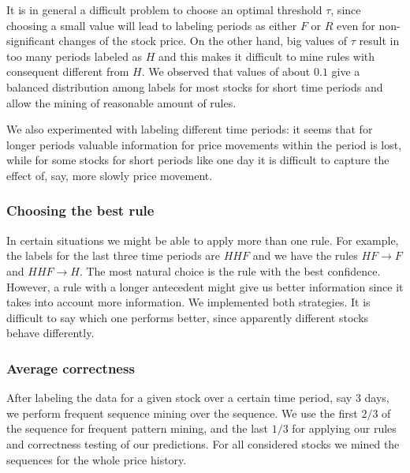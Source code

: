 \documentclass[10pt]{article}
\begin{document}
It is in general a difficult problem to choose an optimal threshold $\tau$, since choosing a small value will lead to labeling periods as either $F$ or $R$ even for non-significant changes of the stock price. On the other hand, big values of $\tau$ result in too many periods labeled as $H$ and this makes it difficult to mine rules with consequent different from $H$.  We observed that values of about $0.1$ give a balanced distribution among labels for most stocks for short time periods and allow the mining of reasonable amount of rules. 

We also experimented with labeling different time periods: it seems that for longer periods valuable information for price movements within the period is lost, while for some stocks for short periods like one day it is difficult to capture the effect of, say, more slowly price movement.  

\subsubsection{Choosing the best rule}
In certain situations we might be able to apply more than one rule. For example, the labels for the last three time periods are $HHF$ and we have the rules $HF \rightarrow F$ and $HHF \rightarrow H$. The most natural choice is the rule with the best confidence. However, a rule with a longer antecedent might give us better information since it takes into account more information. We implemented both strategies. It is difficult to say which one performs better, since apparently different stocks behave differently.  

\subsubsection{Average correctness}

After labeling the data for a given stock over a certain time period, say 3 days, we perform frequent sequence mining over the sequence. We use the first $2/3$ of the sequence for frequent pattern mining, and the last $1/3$ for applying our rules and correctness testing of our predictions. For all considered stocks we mined the sequences for the whole price history. 
\end{document}
